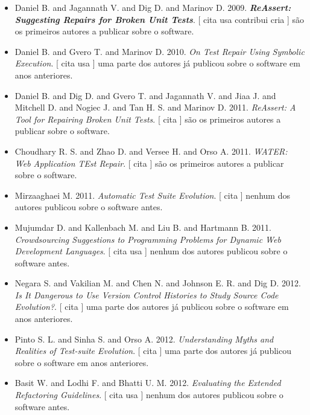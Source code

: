 \begin{itemize}
\item Daniel B. and Jagannath V. and Dig D. and Marinov D.
      2009.
        \textbf{\textit{ ReAssert: Suggesting Repairs for Broken Unit Tests}}.
      [
          cita
          usa
          contribui
          cria
      ]
são os primeiros autores a publicar sobre o software.
\item Daniel B. and Gvero T. and Marinov D.
      2010.
        \textit{ On Test Repair Using Symbolic Execution}.
      [
          cita
          usa
      ]
uma parte dos autores já publicou sobre o software em anos anteriores.
\item Daniel B. and Dig D. and Gvero T. and Jagannath V. and Jiaa J. and Mitchell D. and Nogiec J. and Tan H. S. and Marinov D.
      2011.
        \textit{ ReAssert: A Tool for Repairing Broken Unit Tests}.
      [
          cita
      ]
são os primeiros autores a publicar sobre o software.
\item Choudhary R. S. and Zhao D. and Versee H. and Orso A.
      2011.
        \textit{ WATER: Web Application TEst Repair}.
      [
          cita
      ]
são os primeiros autores a publicar sobre o software.
\item Mirzaaghaei M.
      2011.
        \textit{ Automatic Test Suite Evolution}.
      [
          cita
      ]
nenhum dos autores publicou sobre o software antes.
\item Mujumdar D. and Kallenbach M. and Liu B. and Hartmann B.
      2011.
        \textit{ Crowdsourcing Suggestions to Programming Problems for Dynamic Web Development Languages}.
      [
          cita
          usa
      ]
nenhum dos autores publicou sobre o software antes.
\item Negara S. and Vakilian M. and Chen N. and Johnson E. R. and Dig D.
      2012.
        \textit{ Is It Dangerous to Use Version Control Histories to Study Source Code Evolution?}.
      [
          cita
      ]
uma parte dos autores já publicou sobre o software em anos anteriores.
\item Pinto S. L. and Sinha S. and Orso A.
      2012.
        \textit{ Understanding Myths and Realities of Test-suite Evolution}.
      [
          cita
      ]
uma parte dos autores já publicou sobre o software em anos anteriores.
\item Basit W. and Lodhi F. and Bhatti U. M.
      2012.
        \textit{ Evaluating the Extended Refactoring Guidelines}.
      [
          cita
          usa
      ]
nenhum dos autores publicou sobre o software antes.

\end{itemize}
